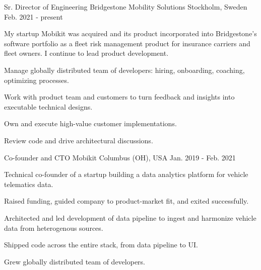 

\begin{cventries}

  \cventry
    {Sr. Director of Engineering} %
    {Bridgestone Mobility Solutions} %
    {Stockholm, Sweden} %
    {Feb. 2021 - present} %
    {
      \begin{cvitems} %
        \item {My startup Mobikit was acquired and its product incorporated into Bridgestone's software portfolio as a fleet risk management product for insurance carriers and fleet owners. I continue to lead product development.}
        \item {Manage globally distributed team of developers: hiring, onboarding, coaching, optimizing processes.}
        \item {Work with product team and customers to turn feedback and insights into executable technical designs.}
        \item {Own and execute high-value customer implementations.}
        \item {Review code and drive architectural discussions.}
      \end{cvitems}
    }

  \cventry
    {Co-founder and CTO} %
    {Mobikit} %
    {Columbus (OH), USA} %
    {Jan. 2019 - Feb. 2021} %
    {
      \begin{cvitems} %
        \item {Technical co-founder of a startup building a data analytics platform for vehicle telematics data.}
        \item {Raised funding, guided company to product-market fit, and exited successfully.}
        \item {Architected and led development of data pipeline to ingest and harmonize vehicle data from heterogenous sources.}
        \item {Shipped code across the entire stack, from data pipeline to UI.}
        \item {Grew globally distributed team of developers.}
      \end{cvitems}
    }


\end{cventries}
